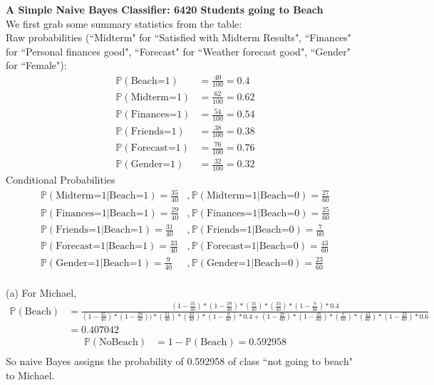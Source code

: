 \documentclass{homeworg}
\begin{document}
\exercise 
\textbf{A Simple Naive Bayes Classifier: 6420 Students going to Beach} \\
We first grab some summary statistics from the table: \\
Raw probabilities (``Midterm" for ``Satisfied with Midterm Results", ``Finances" for ``Personal finances good", ``Forecast" for ``Weather forecast good", ``Gender" for ``Female"):
\begin{align*}
\mathbb{P}(\text{Beach=1})&=\frac{40}{100}=0.4\\
\mathbb{P}(\text{Midterm=1})&=\frac{62}{100}=0.62\\
\mathbb{P}(\text{Finances=1})&=\frac{54}{100}=0.54\\
\mathbb{P}(\text{Friends=1})&=\frac{38}{100}=0.38\\
\mathbb{P}(\text{Forecast=1})&=\frac{76}{100}=0.76\\
\mathbb{P}(\text{Gender=1})&=\frac{32}{100}=0.32
\end{align*}
Conditional Probabilities
\begin{align*}
\mathbb{P}(\text{Midterm=1}|\text{Beach=1})=\frac{35}{40} &, \mathbb{P}(\text{Midterm=1}|\text{Beach=0})=\frac{27}{60} \\
\mathbb{P}(\text{Finances=1}|\text{Beach=1})=\frac{29}{40} &, \mathbb{P}(\text{Finances=1}|\text{Beach=0})=\frac{25}{60} \\
\mathbb{P}(\text{Friends=1}|\text{Beach=1})=\frac{31}{40} &, \mathbb{P}(\text{Friends=1}|\text{Beach=0})=\frac{7}{60} \\
\mathbb{P}(\text{Forecast=1}|\text{Beach=1})=\frac{33}{40} &, \mathbb{P}(\text{Forecast=1}|\text{Beach=0})=\frac{43}{60} \\
\mathbb{P}(\text{Gender=1}|\text{Beach=1})=\frac{9}{40} &, \mathbb{P}(\text{Gender=1}|\text{Beach=0})=\frac{23}{60} \\
\end{align*}

(a) For Michael,
\begin{align*}
\mathbb{P}(\text{Beach})&=\frac{(1-\frac{35}{40})*(1-\frac{29}{40})*(\frac{31}{40})*(\frac{33}{40})*(1-\frac{9}{40})*0.4}{(1-\frac{35}{40})*(1-\frac{29}{40}))*(\frac{31}{40})*(\frac{33}{40})*(1-\frac{9}{40})*0.4+(1-\frac{27}{60})*(1-\frac{25}{60})*(\frac{7}{60})*(\frac{43}{60})*(1-\frac{23}{60})*0.6}\\
&=0.407042
\end{align*}
\begin{align*}
\mathbb{P}(\text{NoBeach})& =1-\mathbb{P}(\text{Beach})=0.592958\\
\end{align*}
So naive Bayes assigns the probability of 0.592958 of class ``not going to beach" to Michael.
\end{document}
